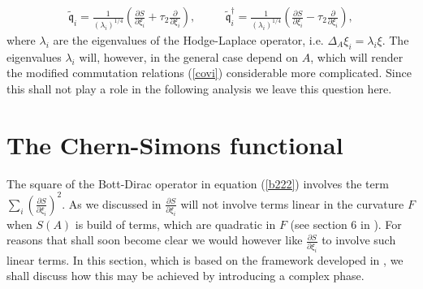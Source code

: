 \documentclass[12pt]{article}
\newcommand{\pa}{\partial}
\begin{document}
\begin{eqnarray}
\tilde{\mathfrak{q}}_i =  \frac{1}{(\lambda_i)^{{1}/{4}}} \left( \frac{\pa S}{\pa \xi_i}+ {\tau_2}   \frac{\pa}{\pa\xi_i}\right)  , &&\quad
\tilde{\mathfrak{q}}_i^\dagger =  \frac{1}{(\lambda_i)^{{1}/{4}}}  \left( \frac{\pa S}{\pa \xi_i} - {\tau_2}\frac{\pa}{\pa\xi_i} \right) ,
\label{morten2}
\end{eqnarray}
where $\lambda_i$ are the eigenvalues of the Hodge-Laplace operator, i.e. $\Delta_A \xi_i=\lambda_i \xi$. The eigenvalues $\lambda_i$  will, however, in the general case depend on $A$, which will render the modified commutation relations (\ref{covi}) considerable more complicated. Since this shall not play a role in the following analysis we leave this question here.

























































\section{The Chern-Simons functional}
\label{secCS}








The square of the Bott-Dirac operator in equation (\ref{b222}) involves the term $\sum_i \left( \frac{\pa S}{\pa \xi_i}\right)^2$. As we discussed in \cite{Aastrup:2019yui} $\frac{\pa S}{\pa \xi_i}$ will not involve terms linear in the curvature $F$ when $S(A)$ is build of terms, which are quadratic in $F$ (see section 6 in \cite{Aastrup:2019yui}). For reasons that shall soon become clear we would however like $\frac{\pa S}{\pa \xi_i}$ to involve such linear terms. In this section, which is based on the framework developed in \cite{Aastrup:2019yui}, we shall discuss how this may be achieved by introducing a complex phase.\\
\end{document}
